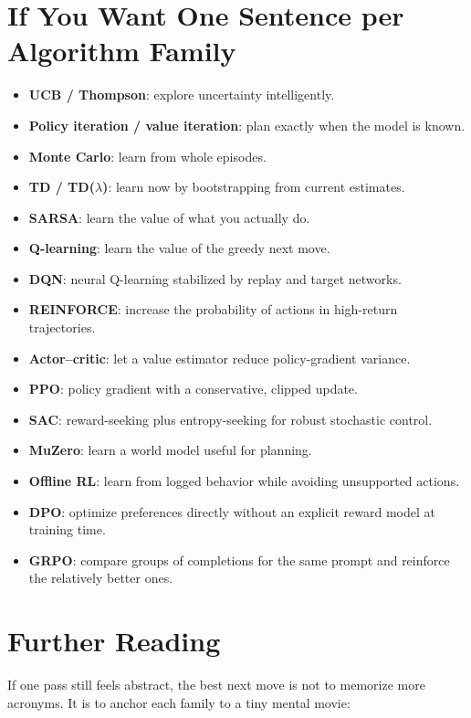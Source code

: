 \documentclass[11pt]{article}
\begin{document}
  \section{If You Want One Sentence per Algorithm Family}

  \begin{itemize}
    \item \textbf{UCB / Thompson}: explore uncertainty intelligently.
    \item \textbf{Policy iteration / value iteration}: plan exactly when the model is known.
    \item \textbf{Monte Carlo}: learn from whole episodes.
    \item \textbf{TD / TD($\lambda$)}: learn now by bootstrapping from current estimates.
    \item \textbf{SARSA}: learn the value of what you actually do.
    \item \textbf{Q-learning}: learn the value of the greedy next move.
    \item \textbf{DQN}: neural Q-learning stabilized by replay and target networks.
    \item \textbf{REINFORCE}: increase the probability of actions in high-return trajectories.
    \item \textbf{Actor--critic}: let a value estimator reduce policy-gradient variance.
    \item \textbf{PPO}: policy gradient with a conservative, clipped update.
    \item \textbf{SAC}: reward-seeking plus entropy-seeking for robust stochastic control.
    \item \textbf{MuZero}: learn a world model useful for planning.
    \item \textbf{Offline RL}: learn from logged behavior while avoiding unsupported actions.
    \item \textbf{DPO}: optimize preferences directly without an explicit reward model at training time.
    \item \textbf{GRPO}: compare groups of completions for the same prompt and reinforce the relatively better ones.
  \end{itemize}

  \section{Further Reading}

  If one pass still feels abstract, the best next move is not to memorize more acronyms. It is to anchor each family to a tiny mental movie:
\end{document}
